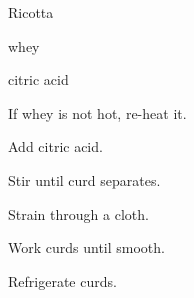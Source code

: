 \begin{recipe}{Ricotta}{}{\C{\quarter}}

\begin{ingredients}
\item {} whey
\item \tp{\quarter} citric acid
\end{ingredients}

\begin{directions}
\item If whey is not hot, re-heat it.
\item Add citric acid.
\item Stir until curd separates.
\item Strain through a cloth.
\item Work curds until smooth.
\item Refrigerate curds.
\end{directions}

\end{recipe}
